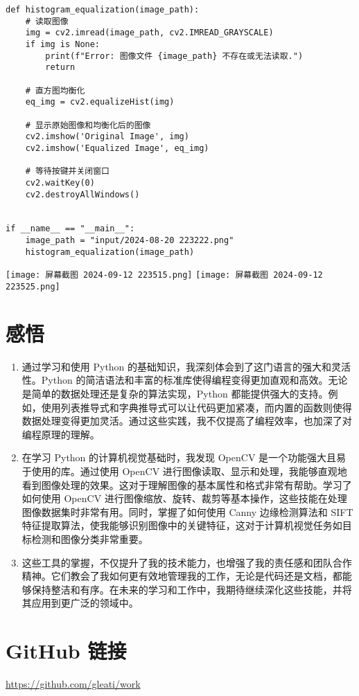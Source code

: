 \documentclass{ctexart}
\begin{document}
\begin{enumerate}[label=\arabic*.]
\begin{lstlisting}
def histogram_equalization(image_path):
    # 读取图像
    img = cv2.imread(image_path, cv2.IMREAD_GRAYSCALE)
    if img is None:
        print(f"Error: 图像文件 {image_path} 不存在或无法读取.")
        return

    # 直方图均衡化
    eq_img = cv2.equalizeHist(img)

    # 显示原始图像和均衡化后的图像
    cv2.imshow('Original Image', img)
    cv2.imshow('Equalized Image', eq_img)

    # 等待按键并关闭窗口
    cv2.waitKey(0)
    cv2.destroyAllWindows()


if __name__ == "__main__":
    image_path = "input/2024-08-20 223222.png"
    histogram_equalization(image_path)
\end{lstlisting}
\texttt{[image: 屏幕截图 2024-09-12 223515.png]}
\texttt{[image: 屏幕截图 2024-09-12 223525.png]}
\end{enumerate}
\section{感悟}
\begin{enumerate}
    \item 通过学习和使用 Python 的基础知识，我深刻体会到了这门语言的强大和灵活性。Python 的简洁语法和丰富的标准库使得编程变得更加直观和高效。无论是简单的数据处理还是复杂的算法实现，Python 都能提供强大的支持。例如，使用列表推导式和字典推导式可以让代码更加紧凑，而内置的函数则使得数据处理变得更加灵活。通过这些实践，我不仅提高了编程效率，也加深了对编程原理的理解。
    
    \item 在学习 Python 的计算机视觉基础时，我发现 OpenCV 是一个功能强大且易于使用的库。通过使用 OpenCV 进行图像读取、显示和处理，我能够直观地看到图像处理的效果。这对于理解图像的基本属性和格式非常有帮助。学习了如何使用 OpenCV 进行图像缩放、旋转、裁剪等基本操作，这些技能在处理图像数据集时非常有用。同时，掌握了如何使用 Canny 边缘检测算法和 SIFT 特征提取算法，使我能够识别图像中的关键特征，这对于计算机视觉任务如目标检测和图像分类非常重要。
    
    \item 这些工具的掌握，不仅提升了我的技术能力，也增强了我的责任感和团队合作精神。它们教会了我如何更有效地管理我的工作，无论是代码还是文档，都能够保持整洁和有序。在未来的学习和工作中，我期待继续深化这些技能，并将其应用到更广泛的领域中。
\end{enumerate}

\section{GitHub 链接}
\url{https://github.com/gleati/work}
\end{document}

